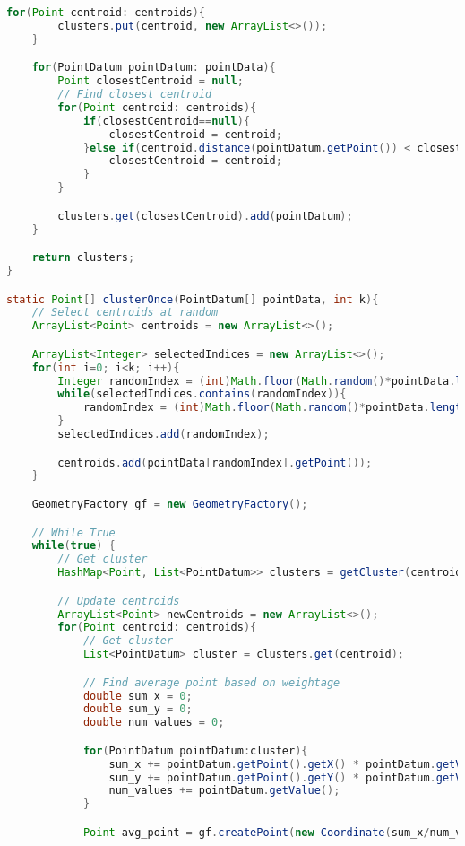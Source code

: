 \begin{lstlisting}[language=JAVA, caption=Algorithm for K means, label=alg:kmeans]
    for(Point centroid: centroids){
        clusters.put(centroid, new ArrayList<>());
    }

    for(PointDatum pointDatum: pointData){
        Point closestCentroid = null;
        // Find closest centroid
        for(Point centroid: centroids){
            if(closestCentroid==null){
                closestCentroid = centroid;
            }else if(centroid.distance(pointDatum.getPoint()) < closestCentroid.distance(pointDatum.getPoint())){
                closestCentroid = centroid;
            }
        }

        clusters.get(closestCentroid).add(pointDatum);
    }

    return clusters;
}

static Point[] clusterOnce(PointDatum[] pointData, int k){
    // Select centroids at random
    ArrayList<Point> centroids = new ArrayList<>();

    ArrayList<Integer> selectedIndices = new ArrayList<>();
    for(int i=0; i<k; i++){
        Integer randomIndex = (int)Math.floor(Math.random()*pointData.length);
        while(selectedIndices.contains(randomIndex)){
            randomIndex = (int)Math.floor(Math.random()*pointData.length);
        }
        selectedIndices.add(randomIndex);

        centroids.add(pointData[randomIndex].getPoint());
    }

    GeometryFactory gf = new GeometryFactory();

    // While True
    while(true) {
        // Get cluster
        HashMap<Point, List<PointDatum>> clusters = getCluster(centroids.toArray(new Point[centroids.size()]), pointData);

        // Update centroids
        ArrayList<Point> newCentroids = new ArrayList<>();
        for(Point centroid: centroids){
            // Get cluster
            List<PointDatum> cluster = clusters.get(centroid);

            // Find average point based on weightage
            double sum_x = 0;
            double sum_y = 0;
            double num_values = 0;

            for(PointDatum pointDatum:cluster){
                sum_x += pointDatum.getPoint().getX() * pointDatum.getValue();
                sum_y += pointDatum.getPoint().getY() * pointDatum.getValue();
                num_values += pointDatum.getValue();
            }

            Point avg_point = gf.createPoint(new Coordinate(sum_x/num_values, sum_y/num_values));


\end{lstlisting}
